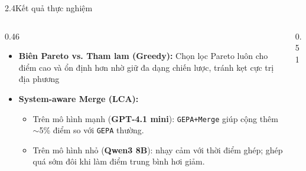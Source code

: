 \begin{frame}{2.4\quad Kết quả thực nghiệm}
  \begin{columns}[T,onlytextwidth]
    \begin{column}{0.46\textwidth}
      \begin{itemize}\setlength{\itemsep}{0.55em}
        \item \textbf{Biên Pareto vs. Tham lam (Greedy):} Chọn lọc Pareto luôn cho điểm
              cao và ổn định hơn nhờ giữ đa dạng chiến lược, tránh kẹt cực trị địa phương
        \item \textbf{System-aware Merge (LCA):}
          \begin{itemize}\tightlist
            \item Trên mô hình mạnh (\textbf{GPT-4.1 mini}): \texttt{GEPA+Merge} giúp cộng
                  thêm $\sim$5\% điểm so với \texttt{GEPA} thường.
            \item Trên mô hình nhỏ (\textbf{Qwen3 8B}): nhạy cảm với thời điểm ghép; ghép
                  quá sớm đôi khi làm điểm trung bình hơi giảm.
          \end{itemize}
      \end{itemize}
    \end{column}
    \begin{column}{0.51\textwidth}
      \centering
      \par{}
    \end{column}
  \end{columns}
\end{frame}


